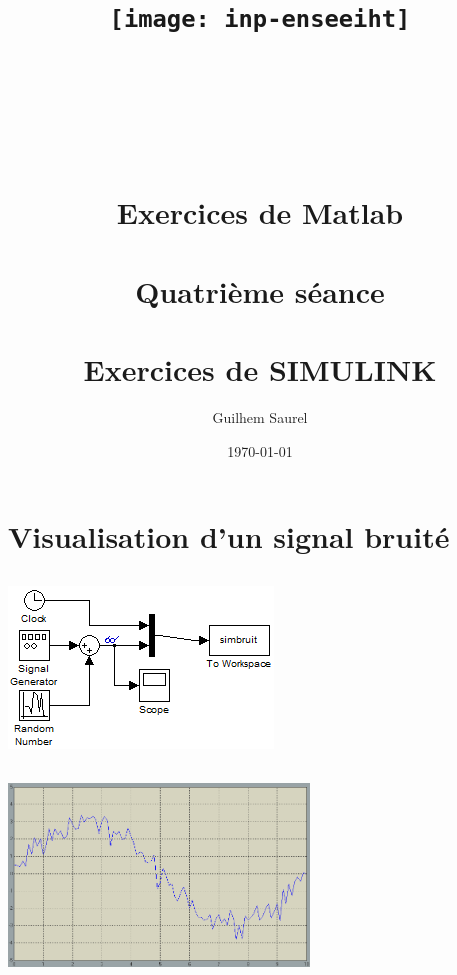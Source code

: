 \documentclass[10pt]{article}
\title{\texttt{[image: inp-enseeiht]} \\ ~ \\ ~ \\ ~ \\ ~ \\ Exercices de Matlab \\ ~ \\ Quatrième séance \\ ~ \\ Exercices de SIMULINK}
\author{Guilhem Saurel}
\date{\today}
\begin{document}
 \begin{titlepage}
  \maketitle
  \tableofcontents
 \end{titlepage}

 \section{Visualisation d’un signal bruité}
  \subsection{}
   \begin{center}
    \includegraphics{1a}
   \end{center}
  \subsection{}
   \begin{center}
    \includegraphics[width=8cm]{1b}
   \end{center}
  \subsection{}
   \inputminted{matlab}{1c.txt}
\end{document}

